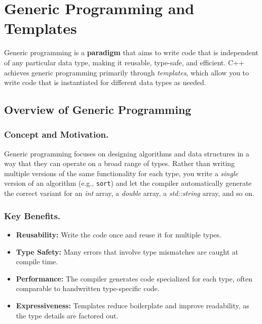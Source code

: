 \section{Generic Programming and Templates}

Generic programming is a \textbf{paradigm} that aims to write code that is independent of any particular data type, making it reusable, type-safe, and efficient. C++ achieves generic programming primarily through \emph{templates}, which allow you to write code that is instantiated for different data types as needed.

\subsection{Overview of Generic Programming}
\subsubsection{Concept and Motivation.}
Generic programming focuses on designing algorithms and data structures in a way that they can operate on a broad range of types. Rather than writing multiple versions of the same functionality for each type, you write a \emph{single} version of an algorithm (e.g., \texttt{sort}) and let the compiler automatically generate the correct variant for an \textit{int} array, a \textit{double} array, a \textit{std::string} array, and so on.

\subsubsection{Key Benefits.}
\begin{itemize}
    \item \textbf{Reusability:} Write the code once and reuse it for multiple types.
    \item \textbf{Type Safety:} Many errors that involve type mismatches are caught at compile time.
    \item \textbf{Performance:} The compiler generates code specialized for each type, often comparable to handwritten type-specific code.
    \item \textbf{Expressiveness:} Templates reduce boilerplate and improve readability, as the type details are factored out.
\end{itemize}

